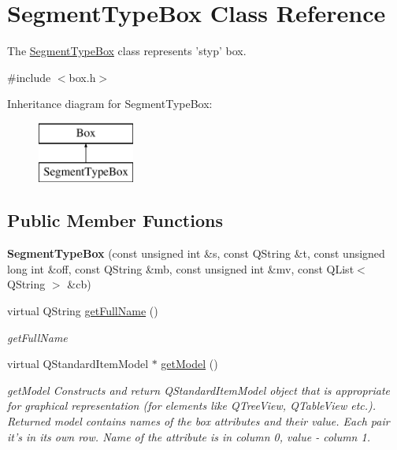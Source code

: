 \hypertarget{class_segment_type_box}{\section{Segment\-Type\-Box Class Reference}
\label{class_segment_type_box}
}


The \hyperlink{class_segment_type_box}{Segment\-Type\-Box} class represents 'styp' box.  




{\ttfamily \#include $<$box.\-h$>$}

Inheritance diagram for Segment\-Type\-Box\-:\begin{figure}[H]
\begin{center}
\leavevmode
\includegraphics[height=2.000000cm]{class_segment_type_box}
\end{center}
\end{figure}
\subsection*{Public Member Functions}
\begin{DoxyCompactItemize}
\item 
\hypertarget{class_segment_type_box_ac1c11b28abc0c91ad360732c053a8f62}{{\bfseries Segment\-Type\-Box} (const unsigned int \&s, const Q\-String \&t, const unsigned long int \&off, const Q\-String \&mb, const unsigned int \&mv, const Q\-List$<$ Q\-String $>$ \&cb)}\label{class_segment_type_box_ac1c11b28abc0c91ad360732c053a8f62}

\item 
virtual Q\-String \hyperlink{class_segment_type_box_aba34f8492af563e14e9f904eab862c62}{get\-Full\-Name} ()
\begin{DoxyCompactList}\small\item\em get\-Full\-Name \end{DoxyCompactList}\item 
virtual Q\-Standard\-Item\-Model $\ast$ \hyperlink{class_segment_type_box_a0b2997e05595074bc692d87e1c12a3e1}{get\-Model} ()
\begin{DoxyCompactList}\small\item\em get\-Model Constructs and return Q\-Standard\-Item\-Model object that is appropriate for graphical representation (for elements like Q\-Tree\-View, Q\-Table\-View etc.). Returned model contains names of the box attributes and their value. Each pair it's in its own row. Name of the attribute is in column 0, value -\/ column 1. \end{DoxyCompactList}\end{DoxyCompactItemize}

